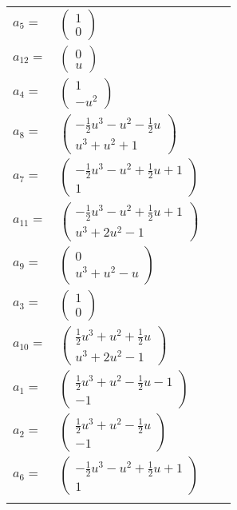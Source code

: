 \documentclass[1p]{elsarticle_modified}
\theoremstyle{definition}
\begin{document}
\begin{tabular}{m{7pt} m{180pt} m{7pt} m{180pt} }
\flushright $a_{5}=$&$\begin{pmatrix}1\\0\end{pmatrix}$ \\
\flushright $a_{12}=$&$\begin{pmatrix}0\\u\end{pmatrix}$ \\
\flushright $a_{4}=$&$\begin{pmatrix}1\\- u^2\end{pmatrix}$ \\
\flushright $a_{8}=$&$\begin{pmatrix}-\frac{1}{2} u^3- u^2-\frac{1}{2} u\\u^3+u^2+1\end{pmatrix}$ \\
\flushright $a_{7}=$&$\begin{pmatrix}-\frac{1}{2} u^3- u^2+\frac{1}{2} u+1\\1\end{pmatrix}$ \\
\flushright $a_{11}=$&$\begin{pmatrix}-\frac{1}{2} u^3- u^2+\frac{1}{2} u+1\\u^3+2 u^2-1\end{pmatrix}$ \\
\flushright $a_{9}=$&$\begin{pmatrix}0\\u^3+u^2- u\end{pmatrix}$ \\
\flushright $a_{3}=$&$\begin{pmatrix}1\\0\end{pmatrix}$ \\
\flushright $a_{10}=$&$\begin{pmatrix}\frac{1}{2} u^3+u^2+\frac{1}{2} u\\u^3+2 u^2-1\end{pmatrix}$ \\
\flushright $a_{1}=$&$\begin{pmatrix}\frac{1}{2} u^3+u^2-\frac{1}{2} u-1\\-1\end{pmatrix}$ \\
\flushright $a_{2}=$&$\begin{pmatrix}\frac{1}{2} u^3+u^2-\frac{1}{2} u\\-1\end{pmatrix}$ \\
\flushright $a_{6}=$&$\begin{pmatrix}-\frac{1}{2} u^3- u^2+\frac{1}{2} u+1\\1\end{pmatrix}$\\&\end{tabular}
\end{document}
